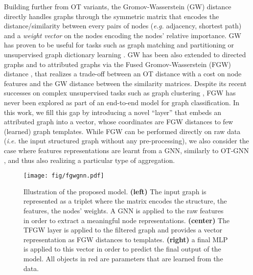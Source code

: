 \documentclass{article}
\begin{document}
Building further from OT variants, the Gromov-Wasserstein (GW) distance~\cite{memoli2011gromov} directly handles graphs through the symmetric matrix  that encodes the distance/similarity between every pairs of nodes (\textit{e.g.} adjacency, shortest path) and a \emph{weight vector}  on the nodes encoding the nodes' relative importance. GW has proven to be useful for  tasks such as graph matching and partitioning \cite{xu2019scalable,chowdhury2021generalized} or unsupervised graph dictionary learning \cite{xu2020gromov, vincent2021online, vincent-cuaz2022semirelaxed}. GW has been
also extended to directed graphs \cite{chowdhury-gromov-wasserstein-2019} and to
attributed graphs via the Fused Gromov-Wasserstein (FGW) distance
\cite{titouan2019optimal, vayer2020fused}, that realizes a trade-off between an OT distance with a cost on node features and the GW distance between the similarity
matrices. Despite its recent successes on complex unsupervised tasks such as graph clustering \cite{xu2020gromov, vincent2021online, vincent-cuaz2022semirelaxed}, FGW has never been explored as part of an end-to-end model for graph
classification. In this work, we fill this gap by introducing a novel ``layer'' that embeds an attributed graph into a vector, whose coordinates are FGW distances to few (learned) graph templates.  While FGW can be performed directly on raw data (\textit{i.e.} the input structured graph without any pre-processing), we also consider the case where features representations are learnt from a GNN, similarly to OT-GNN \cite{chen2020optimal}, and thus also realizing a particular type of aggregation. 
















\begin{figure}[t!]
    \begin{center}
    \texttt{[image: fig/fgwgnn.pdf]}
    \end{center}
    \vspace{-3mm}
    \caption{\label{fig:schema}Illustration of the proposed model. \textbf{(left)} The input graph is represented as
    a triplet  where the matrix  encodes the structure,  the features,  the nodes' weights. A GNN  is applied to the raw features in order
    to extract a meaningful node representations. \textbf{(center)} The
    TFGW layer is applied to the filtered graph and provides a vector representation as FGW distances to templates. \textbf{(right)} a final MLP  is
    applied to this vector in order to predict the final output
    of the model. All objects in \textcolor{myred}{red}  are parameters that are
    learned from the data. \vspace{-4mm}}
\end{figure}
\end{document}
